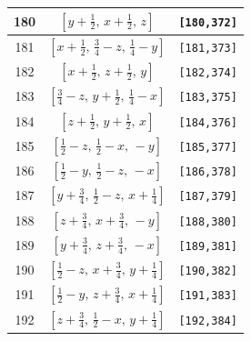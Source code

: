\documentclass[fleqn,8pt]{jsarticle}
\begin{document}
\begin{longtable}{ccc}
180 & $\left[ y + \frac{1}{2},\, x + \frac{1}{2},\, z \right]$ & {\tt [180,372]} \\ \hline
181 & $\left[ x + \frac{1}{2},\, \frac{3}{4} - z,\, \frac{1}{4} - y \right]$ & {\tt [181,373]} \\ \hline
182 & $\left[ x + \frac{1}{2},\, z + \frac{1}{2},\, y \right]$ & {\tt [182,374]} \\ \hline
183 & $\left[ \frac{3}{4} - z,\, y + \frac{1}{2},\, \frac{1}{4} - x \right]$ & {\tt [183,375]} \\ \hline
184 & $\left[ z + \frac{1}{2},\, y + \frac{1}{2},\, x \right]$ & {\tt [184,376]} \\ \hline
185 & $\left[ \frac{1}{2} - z,\, \frac{1}{2} - x,\, - y \right]$ & {\tt [185,377]} \\ \hline
186 & $\left[ \frac{1}{2} - y,\, \frac{1}{2} - z,\, - x \right]$ & {\tt [186,378]} \\ \hline
187 & $\left[ y + \frac{3}{4},\, \frac{1}{2} - z,\, x + \frac{1}{4} \right]$ & {\tt [187,379]} \\ \hline
188 & $\left[ z + \frac{3}{4},\, x + \frac{3}{4},\, - y \right]$ & {\tt [188,380]} \\ \hline
189 & $\left[ y + \frac{3}{4},\, z + \frac{3}{4},\, - x \right]$ & {\tt [189,381]} \\ \hline
190 & $\left[ \frac{1}{2} - z,\, x + \frac{3}{4},\, y + \frac{1}{4} \right]$ & {\tt [190,382]} \\ \hline
191 & $\left[ \frac{1}{2} - y,\, z + \frac{3}{4},\, x + \frac{1}{4} \right]$ & {\tt [191,383]} \\ \hline
192 & $\left[ z + \frac{3}{4},\, \frac{1}{2} - x,\, y + \frac{1}{4} \right]$ & {\tt [192,384]} \\
\end{longtable}
\end{document}

